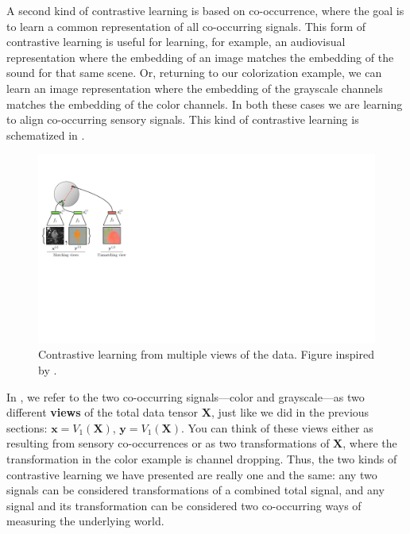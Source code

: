 A second kind of contrastive learning is based on co-occurrence, where the goal is to learn a common representation of all co-occurring signals. This form of contrastive learning is useful for learning, for example, an audiovisual representation where the embedding of an image matches the embedding of the sound for that same scene. Or, returning to our colorization example, we can learn an image representation where the embedding of the grayscale channels matches the embedding of the color channels. In both these cases we are learning to align co-occurring sensory signals. This kind of contrastive learning is schematized in \fig{\ref{fig:representation_learning:contrastive_learning_colorization}}.
\begin{figure}[h!]
    \centerline{
        \includegraphics[width=0.53\linewidth]{figures/representation_learning/contrastive_learning_colorization.pdf}
    }
  \caption{Contrastive learning from multiple views of the data. Figure inspired by \cite{tian2020contrastive}.}
  \label{fig:representation_learning:contrastive_learning_colorization}
\end{figure}

In \fig{\ref{fig:representation_learning:contrastive_learning_colorization}}, we refer to the two co-occurring signals—color and grayscale—as two different \textbf{views} of the total data tensor $\mathbf{X}$, just like we did in the previous sections: $\mathbf{x} = V_1(\mathbf{X})$, $\mathbf{y} = V_1(\mathbf{X})$. You can think of these views either as resulting from sensory co-occurrences or as two transformations of $\mathbf{X}$, where the transformation in the color example is channel dropping. Thus, the two kinds of contrastive learning we have presented are really one and the same: any two signals can be considered transformations of a combined total signal, and any signal and its transformation can be considered two co-occurring ways of measuring the underlying world.

